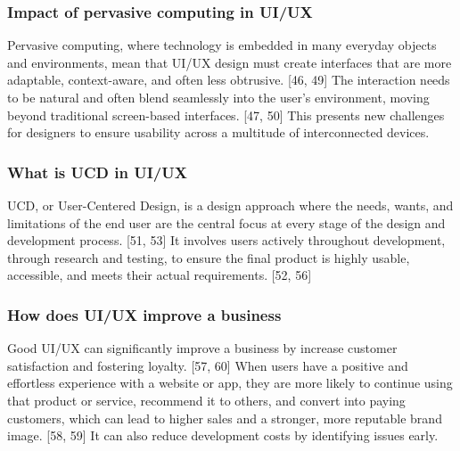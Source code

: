 \documentclass[12pt,a4paper]{article}
\begin{document}
\subsubsection*{Impact of pervasive computing in UI/UX}
Pervasive computing, where technology is embedded in many everyday objects and environments, mean that UI/UX design must create interfaces that are more adaptable, context-aware, and often less obtrusive. [46, 49] The interaction needs to be natural and often blend seamlessly into the user's environment, moving beyond traditional screen-based interfaces. [47, 50] This presents new challenges for designers to ensure usability across a multitude of interconnected devices.

\subsubsection*{What is UCD in UI/UX}
UCD, or User-Centered Design, is a design approach where the needs, wants, and limitations of the end user are the central focus at every stage of the design and development process. [51, 53] It involves users actively throughout development, through research and testing, to ensure the final product is highly usable, accessible, and meets their actual requirements. [52, 56]

\subsubsection*{How does UI/UX improve a business}
Good UI/UX can significantly improve a business by increase customer satisfaction and fostering loyalty. [57, 60] When users have a positive and effortless experience with a website or app, they are more likely to continue using that product or service, recommend it to others, and convert into paying customers, which can lead to higher sales and a stronger, more reputable brand image. [58, 59] It can also reduce development costs by identifying issues early.
\end{document}
